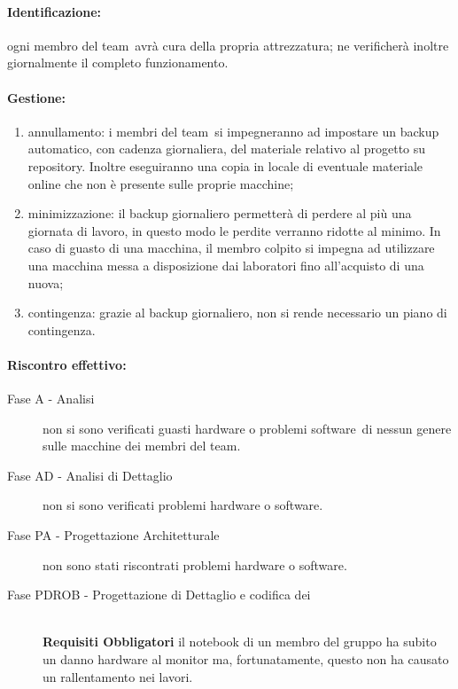 \documentclass[../PianoProgetto.tex]{subfiles}
\begin{document}
		
	\paragraph*{Identificazione:} ogni membro del team\g\ avrà cura della propria attrezzatura; ne verificherà inoltre giornalmente il completo funzionamento.
	
	\paragraph*{Gestione:}
	\begin{enumerate}
		\item annullamento: i membri del team\g\ si impegneranno ad impostare un backup automatico, con cadenza giornaliera, del materiale relativo al progetto su repository\g . Inoltre eseguiranno una copia in locale di eventuale materiale online che non è presente sulle proprie macchine;
		\item minimizzazione: il backup giornaliero permetterà di perdere al più una giornata di lavoro, in questo modo le perdite verranno ridotte al minimo. In caso di guasto di una macchina, il membro colpito si impegna ad utilizzare una macchina messa a disposizione dai laboratori fino all'acquisto di una nuova;
		\item contingenza: grazie al backup giornaliero, non si rende necessario un piano di contingenza.
	\end{enumerate} 	
	
	
	\paragraph*{Riscontro effettivo:}
		\begin{description}
			\item[Fase A - Analisi] non si sono verificati guasti hardware o problemi software\g\ di nessun genere sulle macchine dei membri del team\g .
			\item[Fase AD - Analisi di Dettaglio] non si sono verificati problemi hardware o software\g.
			\item[Fase PA - Progettazione Architetturale] non sono stati riscontrati problemi hardware o software\g.
			\item[Fase PDROB - Progettazione di Dettaglio e codifica dei]  \ \\
					\textbf{Requisiti Obbligatori} il notebook di un membro del gruppo ha subito un danno hardware al monitor ma, fortunatamente, questo non ha causato un rallentamento nei lavori.
		\end{description}
\end{document}
